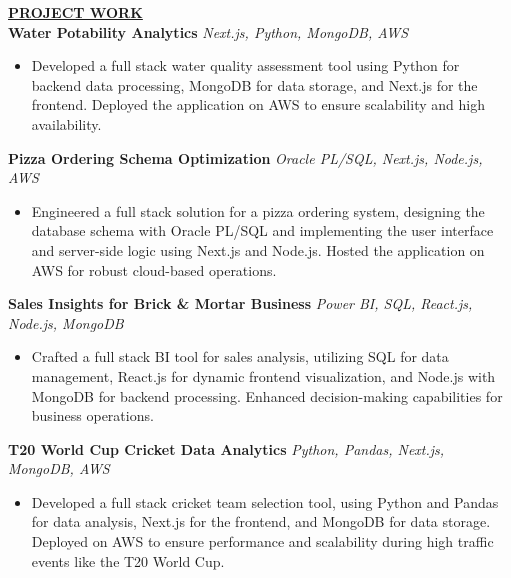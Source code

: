 \documentclass{article}
\begin{document}
%
%


\noindent \textbf{\underline{PROJECT WORK}} \\
\noindent \textbf{Water Potability Analytics} \textit{Next.js, Python, MongoDB, AWS} \hfill \textbf{}
\begin{itemize}[noitemsep,nolistsep,leftmargin=*]
\item {\small Developed a full stack water quality assessment tool using Python for backend data processing, MongoDB for data storage, and Next.js for the frontend. Deployed the application on AWS to ensure scalability and high availability.}
\end{itemize}

\noindent \textbf{Pizza Ordering Schema Optimization} \textit{Oracle PL/SQL, Next.js, Node.js, AWS} \hfill \textbf{}
\begin{itemize}[noitemsep,nolistsep,leftmargin=*]
\item {\small Engineered a full stack solution for a pizza ordering system, designing the database schema with Oracle PL/SQL and implementing the user interface and server-side logic using Next.js and Node.js. Hosted the application on AWS for robust cloud-based operations.}
\end{itemize}

\noindent \textbf{Sales Insights for Brick \& Mortar Business} \textit{Power BI, SQL, React.js, Node.js, MongoDB} \hfill \textbf{}
\begin{itemize}[noitemsep,nolistsep,leftmargin=*]
\item {\small Crafted a full stack BI tool for sales analysis, utilizing SQL for data management, React.js for dynamic frontend visualization, and Node.js with MongoDB for backend processing. Enhanced decision-making capabilities for business operations.}
\end{itemize}

\noindent \textbf{T20 World Cup Cricket Data Analytics} \textit{Python, Pandas, Next.js, MongoDB, AWS} \hfill \textbf{}
\begin{itemize}[noitemsep,nolistsep,leftmargin=*]
\item {\small Developed a full stack cricket team selection tool, using Python and Pandas for data analysis, Next.js for the frontend, and MongoDB for data storage. Deployed on AWS to ensure performance and scalability during high traffic events like the T20 World Cup.}
\end{itemize}
\end{document}
